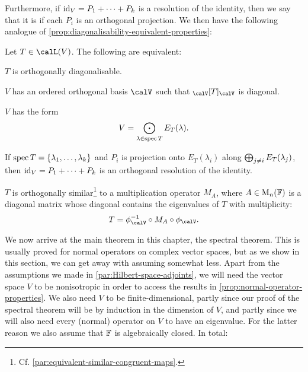 Furthermore, if $\operatorname{id}_V = P_1 + \cdots + P_k$ is a resolution of the identity, then we say that it is  if each $P_i$ is an orthogonal projection. We then have the following analogue of \cref{prop:diagonalisability-equivalent-properties}:

\begin{propositionnoproof}
    \label{prop:orthogonal-diagonalisability-equivalent-properties}
    Let $T \in \lin(V)$. The following are equivalent:
    \begin{enumproposition}
        \item $T$ is orthogonally diagonalisable.
        
        \item $V$ has an ordered orthogonal basis $\calV$ such that $\mr{\calV}{T}{\calV}$ is diagonal.
        
        \item $V$ has the form
        \begin{equation*}
            V
                = \bigodot_{\lambda \in \operatorname{spec} T} E_T(\lambda).
        \end{equation*}
        
        \item If $\operatorname{spec} T = \{\lambda_1, \ldots, \lambda_k\}$ and $P_i$ is projection onto $E_T(\lambda_i)$ along $\bigoplus_{j \neq i} E_T(\lambda_j)$, then $\operatorname{id}_V = P_1 + \cdots + P_k$ is an orthogonal resolution of the identity.
        
        \item $T$ is orthogonally similar\footnote{Cf. \cref{par:equivalent-similar-congruent-maps}.} to a multiplication operator $M_A$, where $A \in \mathrm{M}_{n}(\mathbb{F})$ is a diagonal matrix whose diagonal contains the eigenvalues of $T$ with multiplicity:
        \begin{equation*}
            T
                = \inv{\coordmap{\calV}} \circ M_A \circ \coordmap{\calV}.
        \end{equation*}
    \end{enumproposition}
\end{propositionnoproof}


We now arrive at the main theorem in this chapter, the spectral theorem. This is usually proved for normal operators on complex vector spaces, but as we show in this section, we can get away with assuming somewhat less. Apart from the assumptions we made in \cref{par:Hilbert-space-adjoints}, we will need the vector space $V$ to be nonisotropic in order to access the results in \cref{prop:normal-operator-properties}. We also need $V$ to be finite-dimensional, partly since our proof of the spectral theorem will be by induction in the dimension of $V$, and partly since we will also need every (normal) operator on $V$ to have an eigenvalue. For the latter reason we also assume that $\mathbb{F}$ is algebraically closed. In total:

